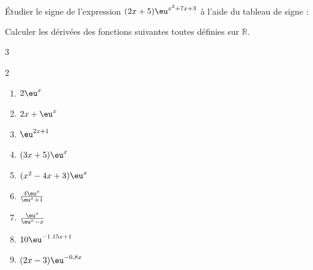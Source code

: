 \documentclass[main.tex]{subfiles}
\begin{document}
\begin{exercise}\hfill \\
 Étudier le signe de l'expression $(2x+5)\eu^{x^2+7x+3}$ à l'aide du tableau de signe :\\
\noindent
\parbox{1\linewidth}{\centering
} 
\end{exercise}  
\bigskip
\begin{exercise} \label{chapter06:exercice:exp:derivation1} Calculer les dérivées des fonctions suivantes toutes définies sur $\mathbb{R}$. 
\begin{multicols}{3}
\begin{spacing}{2} 
\begin{enumerate}[label={\arabic*)$f(x)=$}, leftmargin=*]
	\item  $2\eu^{x}$
	\item $2x+\eu^x$
	\item $\eu^{2x+1}$
	\item $(3x+5)\eu^x$
	\item $(x^2-4x+3)\eu^x$
	\item $\frac{4\eu^x}{\eu^x+1}$
	\item $\frac{\eu^x}{\eu^x-x}$
	\item $10\eu^{-1.15x+1}$
	\item $(2x-3)\eu^{-0,8x}$
\end{enumerate} 
\end{spacing}
\end{multicols}  
\end{exercise}
\end{document}
